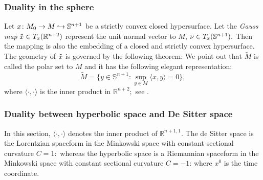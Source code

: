 \subsubsection*{Duality in the sphere}
Let $x\cn M_0\ra M\hra \S^{n+1}$ be a strictly convex closed hypersurface. Let the {\it{Gauss map}} $\~x\in T_x(\R^{n+2})$ represent the unit normal vector to $M$, $\nu\in T_x(\S^{n+1}).$ Then the mapping
is also the embedding of a closed and strictly convex hypersurface. The geometry of $\~x$ is governed by the following theorem:
We point out that $\tilde{M}$ is called the polar set to $M$ and it has the following elegant representation:
$$\tilde{M}=\{y\in \mathbb{S}^{n+1}: \sup_{y\in M}\langle x,y\rangle=0\},$$
where $\langle \cdot,\cdot\rangle$ is the inner product in $\mathbb{R}^{n+2};$ see \cite[Thm.~9.2.9]{Gerhardt:/2006}.
\subsubsection*{Duality between hyperbolic space and De Sitter space} In this section, $\langle \cdot,\cdot\rangle$ denotes the inner product of $\mathbb{R}^{n+1,1}.$
The de Sitter space is the Lorentzian spaceform in the Minkowski space with constant sectional curvature $C=1:$
whereas the hyperbolic space is a Riemannian spaceform in the Minkowski space with constant sectional curvature $C=-1$:
where $x^0$ is the time coordinate.

